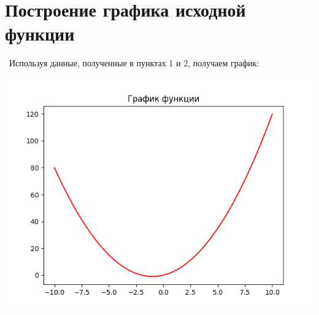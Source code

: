 \documentclass[a4paper,14pt]{extarticle}
\begin{document}
\section{Построение графика исходной функции}\ Используя данные, полученные в пунктах 1 и 2, получаем график:
\begin{center} \includegraphics[scale=0.8]{plot.png} \end{center}
\end{document}
